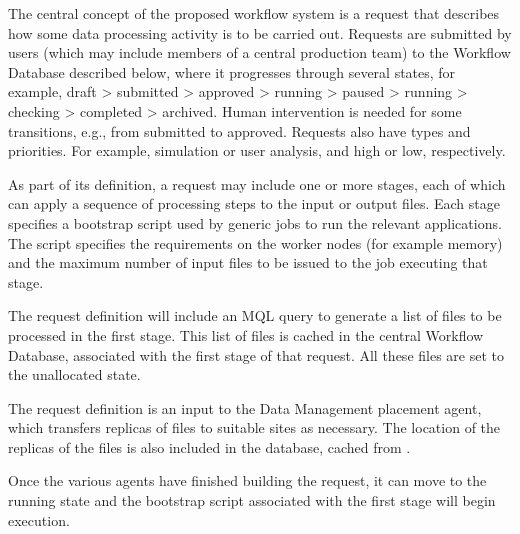 \documentclass[../main-v1.tex]{subfiles}
\begin{document}
The central concept of the proposed workflow system is a request %
that describes how some data processing activity is to be carried out. Requests are submitted by users (which may include members of a central production team) to the Workflow Database described below, where it progresses through %
several states, %
for example, draft > submitted > approved > running > paused > running > checking > completed > archived. Human intervention is needed for some transitions, e.g., from submitted to approved. Requests also have types and priorities. For example, simulation or user analysis, and high or low, respectively.

As part of its definition, a request may include one or more stages, each of which can apply a sequence of processing steps to the input or output files. %
Each stage specifies a bootstrap script used by generic jobs to run the relevant applications. The script specifies the requirements on the worker nodes %
(for example memory) and the maximum number of input files to be issued to %
the job executing that stage.

The %
request definition will include an  MQL query %
to generate a list of files to be processed in the first stage. This list of files is cached in the central Workflow Database, associated with the first stage of that request. All these files are set to the unallocated state. 

The request definition is an input to the Data Management placement agent, which transfers replicas of files to suitable sites as necessary. %
The location of the replicas of the files is also included in the database, cached from . 

Once the various agents have finished building the request, it can move to the running state and the bootstrap script associated with the first stage will begin execution. %
\end{document}
